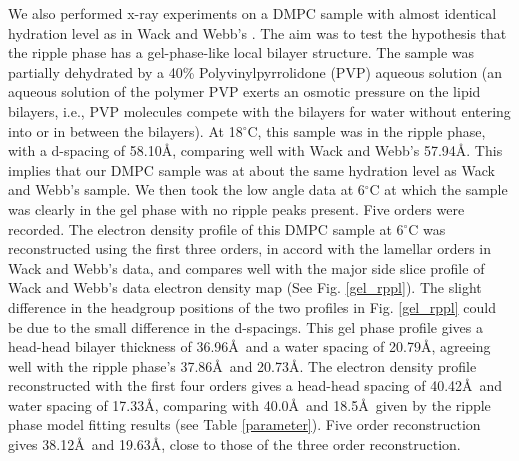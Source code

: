 
We also performed x-ray experiments on a DMPC sample with almost identical
hydration level as in Wack and Webb's \cite{Wac89a}. The aim was to test
the hypothesis that the ripple phase has a gel-phase-like local bilayer
structure. The sample was partially dehydrated by a 40\% Polyvinylpyrrolidone
(PVP) aqueous solution (an aqueous solution of the polymer PVP 
exerts an osmotic pressure
on the lipid bilayers, i.e., PVP molecules compete with the bilayers for
water without entering into or in between the bilayers). At 18$^{\circ}$C, 
this sample was in the ripple phase, with a d-spacing of 58.10\AA, comparing 
well with Wack and Webb's 57.94\AA. This implies that our DMPC sample was at 
about the same hydration level as Wack and Webb's sample. We then took
the low angle data at 6$^{\circ}$C at which the sample was clearly in the
gel phase with no ripple peaks present. Five orders were recorded. The electron
density profile of this DMPC sample at 6$^{\circ}$C was reconstructed using
the first three orders, in accord with the lamellar orders in Wack and Webb's
data, and compares well with the major side slice profile of Wack and Webb's
data electron density map (See Fig. \ref{gel_rppl}). The slight difference
in the headgroup positions of the two profiles in Fig. \ref{gel_rppl} could
be due to the small difference in the d-spacings. This gel phase profile
gives a head-head bilayer thickness of 36.96\AA\ and a water spacing of
20.79\AA, agreeing well with the ripple phase's 37.86\AA\ and 20.73\AA.
The electron density profile reconstructed with the first four orders
gives a head-head spacing of 40.42\AA\ and water spacing of 17.33\AA, 
comparing with 40.0\AA\ and 18.5\AA\ given by the ripple phase model
fitting results (see Table \ref{parameter}). Five order reconstruction
gives 38.12\AA\ and 19.63\AA, close to those of the three order reconstruction.

\pagebreak
